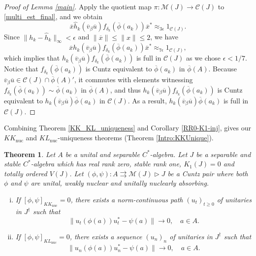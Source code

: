 \documentclass[reqno]{amsart}
\newtheorem{thm}{Theorem}[section]
\theoremstyle{definition}
\theoremstyle{remark}
\numberwithin{equation}{section}
\theoremstyle{definition}
\newcommand{\calC}{\mathcal{C}}
\newcommand{\calM}{\mathcal{M}}
\begin{document}
\begin{proof}[Proof of Lemma \ref{main}]
Apply the quotient map $\pi: \calM(J) \rightarrow \calC(J)$ to \eqref{multi_est_final}, and we obtain
\begin{equation}   
\overline{x} \hat{h}_{k} (\overline{v}_{\beta} \overline{u})f_{\delta_{k}}(\overline\phi(a_k)) \overline{x}^{\ast} \approx_{3\epsilon} 1_{\calC(J)}. \label{approx_final_6} 
\end{equation}   
Since $\|h_{k} - \hat{h}_{k}\|_{\infty} < \epsilon$ and $\|\overline{x}\| \leq \|x\| \leq 2$, we have 
\begin{equation}   
\overline{x} h_{k} (\overline{v}_{\beta} \overline{u})f_{\delta_{k}}(\overline\phi(a_k)) \overline{x}^{\ast} \approx_{7\epsilon} 1_{\calC(J)}, 
\end{equation}   
which implies that $h_{k} (\overline{v}_{\beta} \overline{u})f_{\delta_{k}}(\overline{\phi}(a_k))$ is full in $\calC(J)$ as we chose $\epsilon < 1/7$. Notice that $f_{\delta_{k}}(\overline{\phi}(a_{k}))$ is Cuntz equivalent to $\overline{\phi}(a_{k})$ in $\overline{\phi}(A)$. Because $\overline{v}_{\beta} \overline{u} \in \calC(J)\cap \overline{\phi}(A)'$, it commutes with elements witnessing $f_{\delta_{k}}(\overline{\phi}(a_{k}))\sim \overline{\phi}(a_{k})$ in $\overline{\phi}(A)$, and thus $h_{k} (\overline{v}_{\beta} \overline{u}) f_{\delta_{k}}(\overline{\phi}(a_{k}))$ is Cuntz equivalent to $h_{k}(\overline{v}_{\beta} \overline{u}) \overline{\phi}(a_{k})$ in $\calC(J)$. As a result, $h_{k}(\overline{v}_{\beta} \overline{u}) \overline{\phi}(a_{k})$ is full in $\calC(J)$. 
\end{proof} 

Combining Theorem \ref{KK_KL_uniqueness} and Corollary \ref{RR0-K1-inj}, gives our $KK_{\mathrm{nuc}}$ and $KL_{\mathrm{nuc}}$-uniqueness theorems (Theorem \ref{Intro:KKUnique}). 

\begin{thm}  
\label{KL-uniqueness} 
Let $A$ be a unital and separable $C^*$-algebra. Let $J$ be a separable and stable $C^*$-algebra which has real rank zero, stable rank one, $K_{1}(J) = 0$ and totally ordered $V(J)$. Let $(\phi, \psi) \colon A\rightrightarrows \calM(J)\rhd J$ be a Cuntz pair where both $\phi$ and $\psi$ are unital, weakly nuclear and unitally nuclearly absorbing. 
\begin{enumerate} [(i)]
\item If $[\phi, \psi]_{KK_{\mathrm{nuc}}} = 0$, there exists a norm-continuous path $(u_{t})_{t\geq 0}$ of unitaries in $J^\dagger$ such that 
\begin{equation} 
\|u_t(\phi(a))u_t^*-\psi(a)\|\to 0,\quad a\in A. 
\end{equation} 
\item If $[\phi, \psi]_{KL_{\mathrm{nuc}}} = 0$, there exists a sequence $(u_{n})_n$ of unitaries in $J^\dagger$ such that 
\begin{equation} 
\|u_n(\phi(a))u_n^*-\psi(a)\|\to 0,\quad a\in A. 
\end{equation} 
\end{enumerate} 
\end{thm}  
\end{document}
